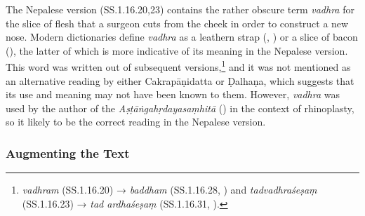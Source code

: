 The Nepalese version (SS.1.16.20,23) contains the rather obscure term \emph{vadhra} for the slice of flesh that a surgeon cuts from the cheek in order to construct a new nose. Modern dictionaries define \emph{vadhra} as a leathern strap (\cite[1385]{apte-prac}, \cite[917]{moni-sans}) or a slice of bacon (\cite[917]{moni-sans}), the latter of which is more indicative of its meaning in the Nepalese version. This word was written out of subsequent versions,\footnote{\emph{vadhram} (SS.1.16.20) → \emph{baddham} (SS.1.16.28, \cite[81]{vulgate}) and \emph{tadvadhraśeṣaṃ} (SS.1.16.23) → \emph{tad ardhaśeṣaṃ} (SS.1.16.31, \cite[81]{vulgate}).} and it was not mentioned as an alternative reading by either Cakrapāṇidatta or Ḍalhaṇa, which suggests that its use and meaning may not have been known to them. However, \emph{vadhra} was used by the author of the \emph{Aṣṭāṅgahṛdayasaṃhitā} () in the context of rhinoplasty, so it likely to be the correct reading in the Nepalese version. 

%

\subsubsection{Augmenting the Text}

